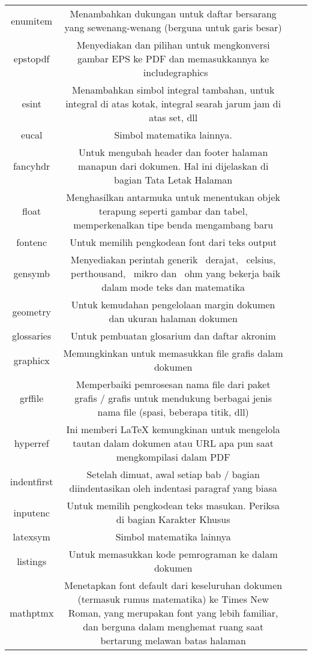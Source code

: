 \begin{table}[ht]
	\centering
	\begin{tabular}{cccc}
		\hline
		enumitem&Menambahkan dukungan untuk daftar bersarang yang sewenang-wenang (berguna untuk garis besar)&\\
		epstopdf&Menyediakan dan pilihan untuk mengkonversi gambar EPS ke PDF dan memasukkannya ke \ includegraphics {}&\\
		esint&Menambahkan simbol integral tambahan, untuk integral di atas kotak, integral searah jarum jam di atas set, dll&\\
		eucal&Simbol matematika lainnya.&\\
		fancyhdr&Untuk mengubah header dan footer halaman manapun dari dokumen. Hal ini dijelaskan di bagian Tata Letak Halaman&\\
		float&Menghasilkan antarmuka untuk menentukan objek terapung seperti gambar dan tabel, memperkenalkan tipe benda mengambang baru &\\
		fontenc&Untuk memilih pengkodean font dari teks output&\\
		gensymb&Menyediakan perintah generik \ derajat, \ celsius, \ perthousand, \ mikro dan \ ohm yang bekerja baik dalam mode teks dan matematika&\\
		geometry&Untuk kemudahan pengelolaan margin dokumen dan ukuran halaman dokumen&\\
		glossaries&Untuk pembuatan glosarium dan daftar akronim&\\
		graphicx&Memungkinkan untuk memasukkan file grafis dalam dokumen&\\
		grffile&Memperbaiki pemrosesan nama file dari paket grafis / grafis untuk mendukung berbagai jenis nama file (spasi, beberapa titik, dll)&\\
		hyperref&Ini memberi LaTeX kemungkinan untuk mengelola tautan dalam dokumen atau URL apa pun saat mengkompilasi dalam PDF&\\
		indentfirst&Setelah dimuat, awal setiap bab / bagian diindentasikan oleh indentasi paragraf yang biasa&\\
		inputenc&Untuk memilih pengkodean teks masukan. Periksa di bagian Karakter Khusus&\\
		latexsym&Simbol matematika lainnya&\\
		listings&Untuk memasukkan kode pemrograman ke dalam dokumen&\\
		mathptmx&Menetapkan font default dari keseluruhan dokumen (termasuk rumus matematika) ke Times New Roman, yang merupakan font yang lebih familiar, dan berguna dalam menghemat ruang saat bertarung melawan batas halaman&\\

\end{tabular}
\end{table}

